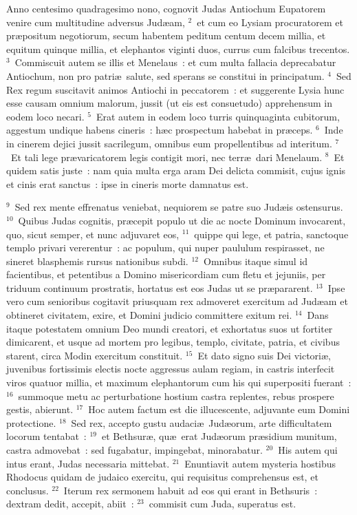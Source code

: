 \bchapter
\lettrine[lines=3,image=true,loversize=0.05,lraise=-0.03]{A}{}nno centesimo quadragesimo nono, cognovit Judas Antiochum Eupatorem venire cum multitudine adversus Jud\ae am,
${}^{2}$~et cum eo Lysiam procuratorem et pr\ae positum negotiorum, secum habentem peditum centum decem millia, et equitum quinque millia, et elephantos viginti duos, currus cum falcibus trecentos.
${}^{3}$~Commiscuit autem se illis et Menelaus~: et cum multa fallacia deprecabatur Antiochum, non pro patri\ae\ salute, sed sperans se constitui in principatum.
${}^{4}$~Sed Rex regum suscitavit animos Antiochi in peccatorem~: et suggerente Lysia hunc esse causam omnium malorum, jussit (ut eis est consuetudo) apprehensum in eodem loco necari.
${}^{5}$~Erat autem in eodem loco turris quinquaginta cubitorum, aggestum undique habens cineris~: h\ae c prospectum habebat in pr\ae ceps.
${}^{6}$~Inde in cinerem dejici jussit sacrilegum, omnibus eum propellentibus ad interitum.
${}^{7}$~Et tali lege pr\ae varicatorem legis contigit mori, nec terr\ae\ dari Menelaum.
${}^{8}$~Et quidem satis juste~: nam quia multa erga aram Dei delicta commisit, cujus ignis et cinis erat sanctus~: ipse in cineris morte damnatus est.


${}^{9}$~Sed rex mente effrenatus veniebat, nequiorem se patre suo Jud\ae is ostensurus.
${}^{10}$~Quibus Judas cognitis, pr\ae cepit populo ut die ac nocte Dominum invocarent, quo, sicut semper, et nunc adjuvaret eos,
${}^{11}$~quippe qui lege, et patria, sanctoque templo privari vererentur~: ac populum, qui nuper paululum respirasset, ne sineret blasphemis rursus nationibus subdi.
${}^{12}$~Omnibus itaque simul id facientibus, et petentibus a Domino misericordiam cum fletu et jejuniis, per triduum continuum prostratis, hortatus est eos Judas ut se pr\ae pararent.
${}^{13}$~Ipse vero cum senioribus cogitavit priusquam rex admoveret exercitum ad Jud\ae am et obtineret civitatem, exire, et Domini judicio committere exitum rei.
${}^{14}$~Dans itaque potestatem omnium Deo mundi creatori, et exhortatus suos ut fortiter dimicarent, et usque ad mortem pro legibus, templo, civitate, patria, et civibus starent, circa Modin exercitum constituit.
${}^{15}$~Et dato signo suis Dei victori\ae , juvenibus fortissimis electis nocte aggressus aulam regiam, in castris interfecit viros quatuor millia, et maximum elephantorum cum his qui superpositi fuerant~:
${}^{16}$~summoque metu ac perturbatione hostium castra replentes, rebus prospere gestis, abierunt.
${}^{17}$~Hoc autem factum est die illucescente, adjuvante eum Domini protectione.
${}^{18}$~Sed rex, accepto gustu audaci\ae\ Jud\ae orum, arte difficultatem locorum tentabat~:
${}^{19}$~et Bethsur\ae , qu\ae\ erat Jud\ae orum pr\ae sidium munitum, castra admovebat~: sed fugabatur, impingebat, minorabatur.
${}^{20}$~His autem qui intus erant, Judas necessaria mittebat.
${}^{21}$~Enuntiavit autem mysteria hostibus Rhodocus quidam de judaico exercitu, qui requisitus comprehensus est, et conclusus.
${}^{22}$~Iterum rex sermonem habuit ad eos qui erant in Bethsuris~: dextram dedit, accepit, abiit~:
${}^{23}$~commisit cum Juda, superatus est.

